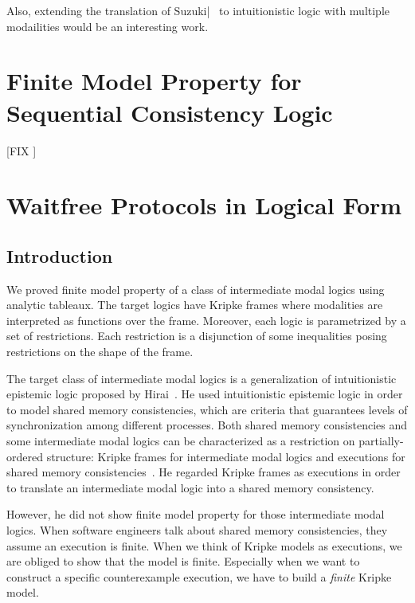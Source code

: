 \documentclass[doctor]{iscs-thesis}
\newcommand{\fix}[1]{[FIX \fbox{#1}]}
\begin{document}
Also, extending the translation of Suzuki|~\cite{suzuki1990kripke} to intuitionistic logic
with multiple modailities would be an interesting work.


\chapter{Finite Model Property for Sequential Consistency Logic}

\fix{just put NASSLLI paper here.}

\chapter{Waitfree Protocols in Logical Form}


\section{Introduction}

We proved finite model property of a class of intermediate modal logics
using analytic tableaux.
The target logics have Kripke frames where modalities are interpreted as
functions over the frame.  Moreover, each logic is parametrized by a
set of restrictions.  Each restriction is a disjunction of some
inequalities posing restrictions on the shape of the frame.

The target class of intermediate modal logics is a generalization of
intuitionistic epistemic logic proposed by Hirai~\cite{hirailpar}.
He used intuitionistic epistemic logic in order to model shared memory
consistencies, which are criteria that guarantees levels of
synchronization among different processes.
Both shared memory consistencies and some intermediate modal logics
can be characterized as a restriction on
partially-ordered structure:
Kripke frames for intermediate modal logics
and executions for shared memory
consistencies~\cite{steinke2004unified}.
He regarded Kripke frames as executions in order to translate
an intermediate modal logic into a shared memory
consistency.

However, he did not show finite model property for those
intermediate modal logics.  When software engineers talk about shared
memory consistencies, they assume an execution is finite.
When we think of Kripke models as executions, we are obliged to show
that the model is finite.
Especially when we want to construct a specific counterexample execution,
we have to build a \textit{finite} Kripke model.
\end{document}
